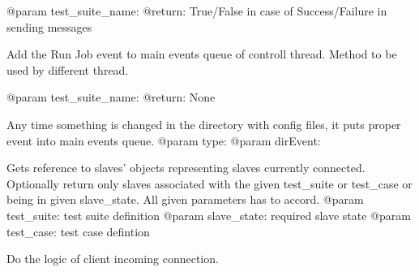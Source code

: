 \documentclass[letterpaper,10pt,english]{sphinxmanual}
\begin{document}
\begin{fulllineitems}
\begin{fulllineitems}
@param test\_suite\_name:
@return: True/False in case of Success/Failure in sending messages

\end{fulllineitems}


\begin{fulllineitems}
\label{ref-manual/XrdTestMaster:XrdTestMaster.XrdTestMaster.fireEnqueueJobEvent}
Add the Run Job event to main events queue of controll thread.
Method to be used by different thread.

@param test\_suite\_name:
@return: None

\end{fulllineitems}


\begin{fulllineitems}
\label{ref-manual/XrdTestMaster:XrdTestMaster.XrdTestMaster.fireReloadDefinitionsEvent}
Any time something is changed in the directory with config files,
it puts proper event into main events queue.
@param type:
@param dirEvent:

\end{fulllineitems}


\begin{fulllineitems}
\label{ref-manual/XrdTestMaster:XrdTestMaster.XrdTestMaster.getSuiteSlaves}
Gets reference to slaves' objects representing slaves currently
connected. Optionally return only slaves associated with the given
test\_suite or test\_case
or being in given slave\_state. All given parameters has to accord.
@param test\_suite: test suite definition
@param slave\_state: required slave state
@param test\_case: test case defintion

\end{fulllineitems}


\begin{fulllineitems}
\label{ref-manual/XrdTestMaster:XrdTestMaster.XrdTestMaster.handleClientConnected}
Do the logic of client incoming connection.


\end{fulllineitems}
\end{fulllineitems}
\end{document}
